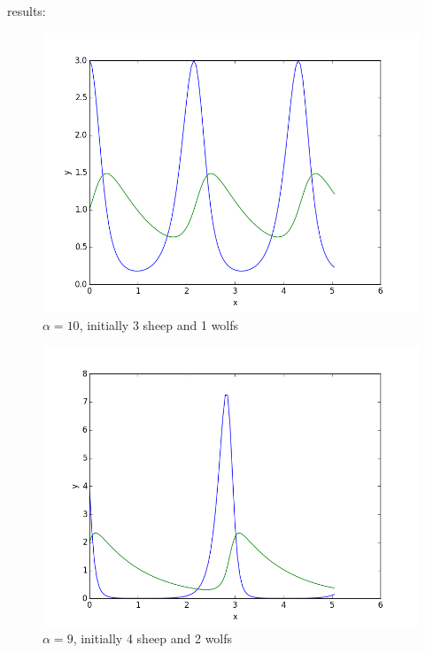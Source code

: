 results:


\begin{figure}[!ht]
\includegraphics[width=1\textwidth]{chapters/images/figure-7-15-1}
\caption{$\alpha = 10$, initially 3 sheep and 1 wolfs}
\end{figure}


\begin{figure}[!ht]
\includegraphics[width=1\textwidth]{chapters/images/figure-7-15-2}
\caption{$\alpha = 9$, initially 4 sheep and 2 wolfs}
\end{figure}


